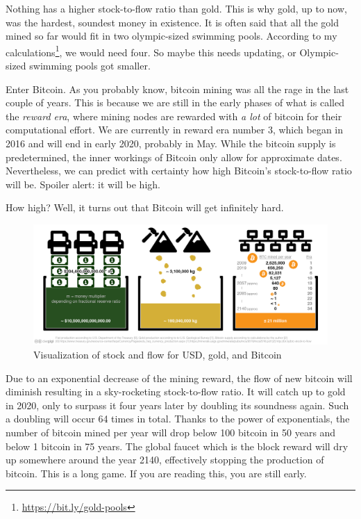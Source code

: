 Nothing has a higher stock-to-flow ratio than gold. This is why gold, up to now,
was the hardest, soundest money in existence. It is often said that all the gold
mined so far would fit in two olympic-sized swimming pools. According to my
calculations\footnote{\url{https://bit.ly/gold-pools}}, we would need four. So
maybe this needs updating, or Olympic-sized swimming pools got smaller.

Enter Bitcoin. As you probably know, bitcoin mining was all the rage in
the last couple of years. This is because we are still in the early
phases of what is called the \textit{reward era}, where mining nodes are
rewarded with \textit{a lot} of bitcoin for their computational effort. We are
currently in reward era number 3, which began in 2016 and will end in
early 2020, probably in May. While the bitcoin supply is predetermined,
the inner workings of Bitcoin only allow for approximate dates.
Nevertheless, we can predict with certainty how high Bitcoin's
stock-to-flow ratio will be. Spoiler alert: it will be high.

How high? Well, it turns out that Bitcoin will get infinitely hard.

\begin{figure}
  \includegraphics{assets/images/stock-to-flow-white-cc-by-sources.png}
  \caption{Visualization of stock and flow for USD, gold, and Bitcoin}
  \label{fig:stock-to-flow-white-cc-by-sources}
\end{figure}

Due to an exponential decrease of the mining reward, the flow of new
bitcoin will diminish resulting in a sky-rocketing stock-to-flow ratio.
It will catch up to gold in 2020, only to surpass it four years later by
doubling its soundness again. Such a doubling will occur 64 times in
total. Thanks to the power of exponentials, the number of bitcoin mined
per year will drop below 100 bitcoin in 50 years and below 1 bitcoin in
75 years. The global faucet which is the block reward will dry up
somewhere around the year 2140, effectively stopping the production of
bitcoin. This is a long game. If you are reading this, you are still
early.

